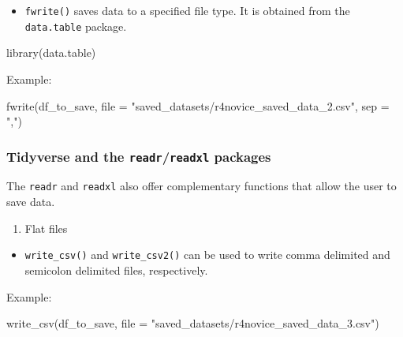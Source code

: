 \documentclass[
  letterpaper,
  DIV=11,
  numbers=noendperiod]{scrreprt}
\newenvironment{Shaded}{\begin{snugshade}}{\end{snugshade}}
\newcommand{\AttributeTok}[1]{\textcolor[rgb]{0.40,0.45,0.13}{#1}}
\newcommand{\FunctionTok}[1]{\textcolor[rgb]{0.28,0.35,0.67}{#1}}
\newcommand{\NormalTok}[1]{\textcolor[rgb]{0.00,0.23,0.31}{#1}}
\newcommand{\StringTok}[1]{\textcolor[rgb]{0.13,0.47,0.30}{#1}}
\providecommand{\tightlist}{%
  \setlength{\itemsep}{0pt}\setlength{\parskip}{0pt}}\usepackage{longtable,booktabs,array}
\begin{document}
\begin{itemize}
\tightlist
\item
  \texttt{fwrite()} saves data to a specified file type. It is obtained
  from the \texttt{data.table} package.
\end{itemize}

\begin{Shaded}
\begin{Highlighting}[]
\FunctionTok{library}\NormalTok{(data.table)}
\end{Highlighting}
\end{Shaded}

Example:

\begin{Shaded}
\begin{Highlighting}[]
\FunctionTok{fwrite}\NormalTok{(df\_to\_save, }\AttributeTok{file =} \StringTok{"saved\_datasets/r4novice\_saved\_data\_2.csv"}\NormalTok{, }\AttributeTok{sep =} \StringTok{","}\NormalTok{)}
\end{Highlighting}
\end{Shaded}

\subsubsection{\texorpdfstring{Tidyverse and the
\texttt{readr}/\texttt{readxl}
packages}{Tidyverse and the readr/readxl packages}}\label{tidyverse-and-the-readrreadxl-packages-1}

The \texttt{readr} and \texttt{readxl} also offer complementary
functions that allow the user to save data.

\begin{enumerate}
\def\labelenumi{\alph{enumi}.}
\tightlist
\item
  Flat files
\end{enumerate}

\begin{itemize}
\tightlist
\item
  \texttt{write\_csv()} and \texttt{write\_csv2()} can be used to write
  comma delimited and semicolon delimited files, respectively.
\end{itemize}

Example:

\begin{Shaded}
\begin{Highlighting}[]
\FunctionTok{write\_csv}\NormalTok{(df\_to\_save, }\AttributeTok{file =} \StringTok{"saved\_datasets/r4novice\_saved\_data\_3.csv"}\NormalTok{)}
\end{Highlighting}
\end{Shaded}
\end{document}
